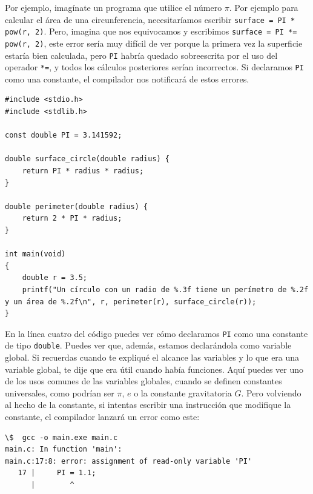 \documentclass[a4paper]{article}
\begin{document}
Por ejemplo, imagínate un programa que utilice el número $\pi$. Por ejemplo
para calcular el área de una circunferencia, necesitaríamos escribir
\verb!surface = PI * pow(r, 2)!. Pero, imagina que nos equivocamos y escribimos
\verb!surface = PI *= pow(r, 2)!, este error sería muy difícil de ver porque
la primera vez la superficie estaría bien calculada, pero \verb!PI! habría
quedado sobreescrita por el uso del operador \verb!*=!, y todos los cálculos
posteriores serían incorrectos. Si declaramos \verb!PI! como una constante,
el compilador nos notificará de estos errores.

\noindent
\begin{minipage}[H]{\linewidth}
\mbox{}
\begin{lstlisting}[style=C,
caption={Uso de una constante numérica},
label={lst:constantUsage}]
#include <stdio.h>
#include <stdlib.h>

const double PI = 3.141592;

double surface_circle(double radius) {
    return PI * radius * radius;
}

double perimeter(double radius) {
    return 2 * PI * radius;
}

int main(void)
{
    double r = 3.5;
    printf("Un círculo con un radio de %.3f tiene un perímetro de %.2f y un área de %.2f\n", r, perimeter(r), surface_circle(r));
}
\end{lstlisting}
\end{minipage}

En la línea cuatro del código puedes ver cómo declaramos \verb!PI! como una
constante de tipo \verb!double!. Puedes ver que, además, estamos declarándola
como variable global. Si recuerdas cuando te expliqué el alcance las variables y
lo que era una variable global, te dije que era útil cuando había funciones.
Aquí puedes ver uno de los usos comunes de las variables globales, cuando se
definen constantes universales, como podrían ser $\pi$, $e$ o la constante
gravitatoria $G$. Pero volviendo al hecho de la constante, si intentas escribir
una instrucción que modifique la constante, el compilador lanzará un error como
este:

\noindent
\begin{minipage}[H]{\linewidth}
\mbox{}
\begin{lstlisting}[style=terminalStyle]
\$  gcc -o main.exe main.c
main.c: In function 'main':
main.c:17:8: error: assignment of read-only variable 'PI'
   17 |     PI = 1.1;
      |        ^
\end{lstlisting}
\end{minipage}
\end{document}
